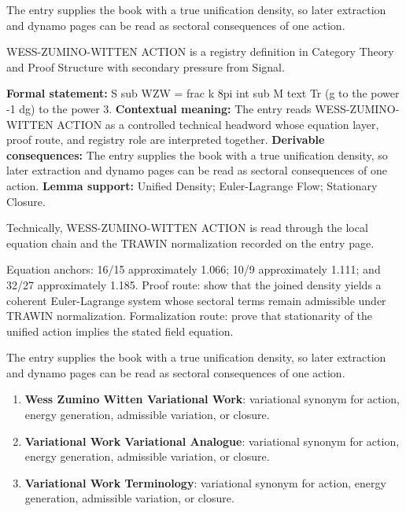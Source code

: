 The entry supplies the book with a true unification density, so later extraction and dynamo pages can be read as sectoral consequences of one action.
\clearpage


\begingroup\small
{}
WESS-ZUMINO-WITTEN ACTION is a registry definition in Category Theory and Proof Structure with secondary pressure from Signal.

\begingroup\footnotesize\setlength{\emergencystretch}{3em}\sloppy
\textbf{Formal statement:} S sub WZW = frac k 8pi int sub M text Tr (g to the power -1 dg) to the power 3. \textbf{Contextual meaning:} The entry reads WESS-ZUMINO-WITTEN ACTION as a controlled technical headword whose equation layer, proof route, and registry role are interpreted together. \textbf{Derivable consequences:} The entry supplies the book with a true unification density, so later extraction and dynamo pages can be read as sectoral consequences of one action. \textbf{Lemma support:} Unified Density; Euler-Lagrange Flow; Stationary Closure.\par
\endgroup

Technically, WESS-ZUMINO-WITTEN ACTION is read through the local equation chain and the TRAWIN normalization recorded on the entry page.

Equation anchors: 16/15 approximately 1.066; 10/9 approximately 1.111; and 32/27 approximately 1.185. Proof route: show that the joined density yields a coherent Euler-Lagrange system whose sectoral terms remain admissible under TRAWIN normalization. Formalization route: prove that stationarity of the unified action implies the stated field equation.

The entry supplies the book with a true unification density, so later extraction and dynamo pages can be read as sectoral consequences of one action.
\endgroup

\begin{enumerate}[leftmargin=1.6em,itemsep=6pt,topsep=4pt]
\item \textbf{Wess Zumino Witten Variational Work}: variational synonym for action, energy generation, admissible variation, or closure.
\item \textbf{Variational Work Variational Analogue}: variational synonym for action, energy generation, admissible variation, or closure.
\item \textbf{Variational Work Terminology}: variational synonym for action, energy generation, admissible variation, or closure.
\end{enumerate}

